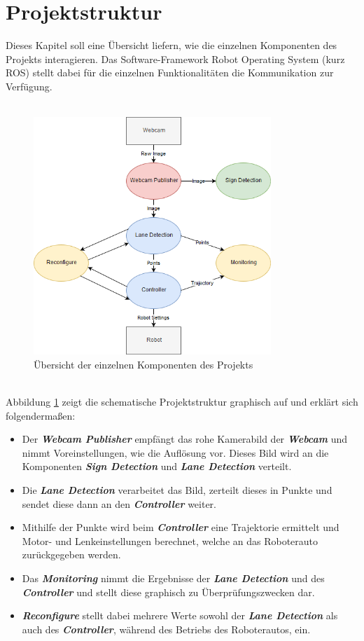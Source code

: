 \section{Projektstruktur}
Dieses Kapitel soll eine \"Ubersicht liefern, wie die einzelnen Komponenten des Projekts interagieren. Das Software-Framework Robot Operating System\cite{ROS} (kurz ROS) stellt dabei f\"ur die einzelnen Funktionalit\"aten die Kommunikation zur Verf\"ugung. \\\\
\begin{figure}[h]
	\centering
	\includegraphics[width = 0.8\textwidth]{images/Projektaufbau.png}
	\caption{\"Ubersicht der einzelnen Komponenten des Projekts}
	\label{fig:projektaufbau}
\end{figure}
\\
Abbildung \ref{fig:projektaufbau} zeigt die schematische Projektstruktur graphisch auf und erkl\"art sich folgenderma\ss{}en:
\begin{itemize}
\item Der \textbf{\textit{Webcam Publisher}} empf\"angt das rohe Kamerabild der \textbf{\textit{Webcam}} und nimmt Voreinstellungen, wie die Aufl\"osung vor. Dieses Bild wird an die Komponenten \textbf{\textit{Sign Detection}} und \textbf{\textit{Lane Detection}} verteilt.
\item Die \textbf{\textit{Lane Detection}} verarbeitet das Bild, zerteilt dieses in Punkte und sendet diese dann an den \textbf{\textit{Controller}} weiter.
\item Mithilfe der Punkte wird beim \textbf{\textit{Controller}} eine Trajektorie ermittelt und Motor- und Lenkeinstellungen berechnet, welche an das Roboterauto zur\"uckgegeben werden.
\item Das \textbf{\textit{Monitoring}} nimmt die Ergebnisse der \textbf{\textit{Lane Detection}} und des \textbf{\textit{Controller}} und stellt diese graphisch zu \"Uberpr\"ufungszwecken dar.
\item \textbf{\textit{Reconfigure}} stellt dabei mehrere Werte sowohl der \textbf{\textit{Lane Detection}} als auch des \textbf{\textit{Controller}}, w\"ahrend des Betriebs des Roboterautos, ein.
\end{itemize}
